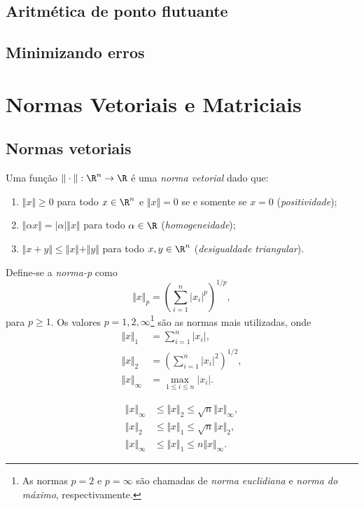 \documentclass{article}
\begin{document}
\subsection{Aritmética de ponto flutuante}
\subsection{Minimizando erros}

\section{Normas Vetoriais e Matriciais}

\subsection{Normas vetoriais}

\begin{defn}
    Uma função \(\Vert \cdot \Vert : \R^n \to \R\) é uma \emph{norma vetorial} dado que:
    \begin{enumerate}
        \item \(\Vert x \Vert \geq 0\) para todo \(x \in \R^n\) e \(\Vert x \Vert = 0\) se e somente se \(x = 0\) (\emph{positividade});
        \item \(\Vert \alpha x \Vert = |\alpha| \Vert x \Vert\) para todo \(\alpha \in \R\) (\emph{homogeneidade});
        \item \(\Vert x + y \Vert \leq \Vert x \Vert + \Vert y \Vert\) para todo \(x, y \in \R^n\) (\emph{desigualdade triangular}).
    \end{enumerate}
\end{defn}

Define-se a \emph{norma-p} como
\[
    \Vert x \Vert_p = \left( \sum_{i=1}^n |x_i|^p \right)^{1/p},
\]
para \(p \geq 1\). Os valores \(p = 1, 2, \infty\)\footnote{As normas \(p=2\) e \(p=\infty\) são chamadas de \emph{norma euclidiana} e \emph{norma do máximo}, respectivamente.} são as normas mais utilizadas, onde
\begin{align*}
    \Vert x \Vert_1 &= \sum_{i=1}^n |x_i|, \\
    \Vert x \Vert_2 &= \left( \sum_{i=1}^n |x_i|^2 \right)^{1/2}, \\
    \Vert x \Vert_\infty &= \max_{1 \leq i \leq n} |x_i|.
\end{align*}

\begin{lem} 
    \begin{align*}
        \Vert x \Vert_\infty &\leq \Vert x \Vert_2 \leq \sqrt{n} \Vert x \Vert_\infty, \\
        \Vert x \Vert_2 &\leq \Vert x \Vert_1 \leq \sqrt{n} \Vert x \Vert_2, \\
        \Vert x \Vert_\infty &\leq \Vert x \Vert_1 \leq n \Vert x \Vert_\infty.
    \end{align*}
\end{lem}
\end{document}
